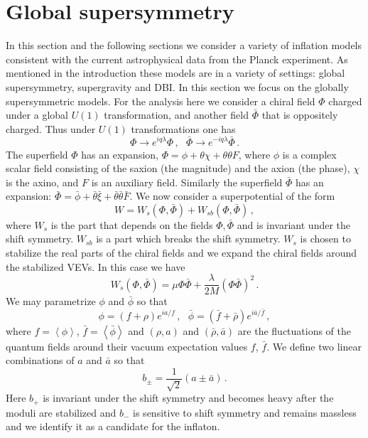 \documentclass[12pt]{article}
\begin{document}
\section{Global supersymmetry \label{sec:Supersymmetry}}
In this section and the following sections we consider a variety of inflation models consistent with the current astrophysical data from the Planck experiment.
As mentioned in the introduction these models are in a variety of settings: global supersymmetry, supergravity and DBI.
In this section we focus on the globally supersymmetric models.
For the analysis here we consider a chiral field $\Phi$ charged under a global $U\left(1\right)$ transformation, and another field $\bar\Phi$ that is oppositely charged.
Thus under $U\left(1\right)$ transformations one has
\begin{equation}
  \Phi \to e^{i q \lambda} \Phi\,,
  ~~~ \bar\Phi \to e^{-i q \lambda} \bar\Phi\,.
\end{equation}
The superfield $\Phi$ has an expansion, $\Phi = \phi + \theta \chi + \theta \theta F$, where $\phi$ is a complex scalar field consisting of the saxion (the magnitude) and the axion (the phase), $\chi$ is the axino, and $F$ is an auxiliary field.
Similarly the superfield $\bar\Phi$ has an expansion: $\bar\Phi = \bar\phi + \bar\theta \bar\xi + \bar\theta \bar\theta \bar F$.
We now consider a superpotential of the form
\begin{equation} \label{eq:supersymmetry:W}
  W = W_s\left(\Phi, \bar\Phi\right) + W_{sb}\left(\Phi, \bar\Phi\right)\,,
\end{equation}
where $W_s$ is the part that depends on the fields $\Phi, \bar\Phi$ and is invariant under the shift symmetry.
$W_{sb}$ is a part which breaks the shift symmetry.
$W_s$ is chosen to stabilize the real parts of the chiral fields and we expand the chiral fields around the stabilized VEVs.
In this case we have
\begin{equation}
  W_s\left(\Phi, \bar\Phi\right) =
    \mu \Phi \bar\Phi + \frac{\lambda}{2 M} \left(\Phi \bar\Phi\right)^2\,.
\end{equation}
We may parametrize $\phi$ and $\bar\phi$ so that
\begin{equation}
  \phi = \left(f + \rho\right) e^{i a / f}\,,
  ~~~ \bar\phi = \left(\bar f + \bar\rho\right) e^{i \bar a / \bar f}\,,
\end{equation}
where $f = \left<\phi\right>$, $\bar f = \left<\bar\phi\right>$ and $\left(\rho, a\right)$ and $\left(\bar\rho, \bar a\right)$ are the fluctuations of the quantum fields around their vacuum expectation values $f$, $\bar f$.
We define two linear combinations of $a$ and $\bar a$ so that
\begin{equation} \label{eq:b+-}
  b_{\pm}= \frac{1}{\sqrt 2} \left(a \pm \bar a\right)\,.
\end{equation}
Here $b_+$ is invariant under the shift symmetry and becomes heavy after the moduli are stabilized and $b_-$ is sensitive to shift symmetry and remains massless and we identify it as a candidate for the inflaton.
\end{document}

